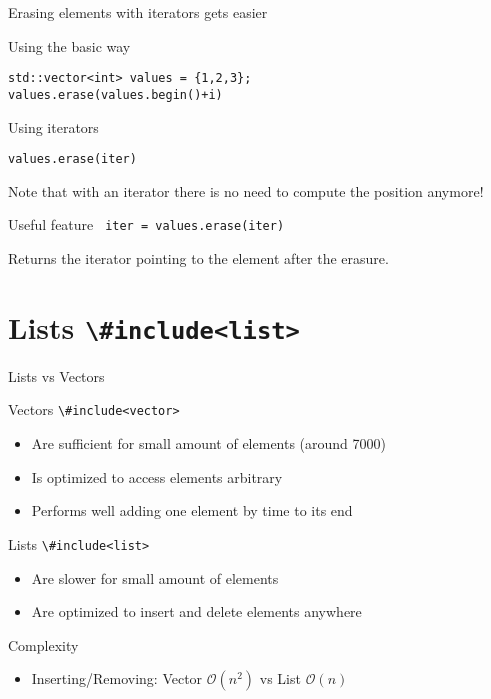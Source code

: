 \documentclass[\classoption]{beamer}
\begin{document}
\begin{frame}[fragile]{Erasing elements with iterators gets easier }

\begin{block}{Using the basic way }
\begin{lstlisting}
std::vector<int> values = {1,2,3};
values.erase(values.begin()+i)
\end{lstlisting}
\end{block}

\begin{block}{Using iterators}
\begin{lstlisting}
values.erase(iter)
\end{lstlisting}
\end{block}
Note that with an iterator there is no need to compute the position anymore!

\begin{block}{Useful feature}
\lstinline| iter = values.erase(iter)|
\end{block}
Returns the iterator pointing to the element after the erasure.
\end{frame}


\section{Lists \lstinline|\#include<list>|}

\begin{frame}{Lists vs Vectors}

\begin{block}{Vectors \lstinline|\#include<vector>|}
\begin{itemize}
\item Are sufficient for small amount of elements (around 7000)
\item Is optimized to access elements arbitrary
\item Performs well adding one element by time to its end
\end{itemize}
\end{block}

\begin{block}{Lists \lstinline|\#include<list>|  }
\begin{itemize}
\item Are slower for small amount of elements
\item Are optimized to insert and delete elements anywhere
\end{itemize}
\end{block}
\begin{block}{Complexity}
\begin{itemize}
\item Inserting/Removing: Vector $\mathcal{O}(n^2)$ vs List $\mathcal{O}(n)$~\cite{Wirth:1978:ADS:540029,knuth1997art}
\end{itemize}
\end{block}
\end{frame}
\end{document}
